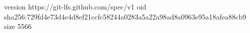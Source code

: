 version https://git-lfs.github.com/spec/v1
oid sha256:729fd4e73d4e4d8ef21ccfc58244a0283a5a22a98ad8a0963e95a18afea88cb9
size 5566
